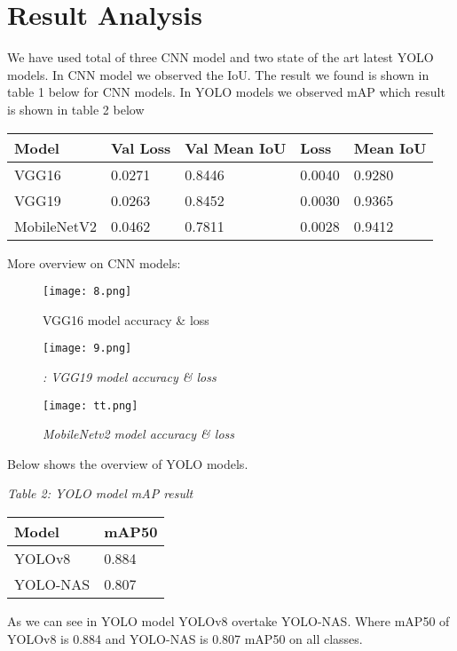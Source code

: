 \documentclass[conference]{IEEEtran}
\begin{document}
\section{Result Analysis}
We have used total of three CNN model and two state of the art latest YOLO models. In CNN model we observed the IoU. The result we found is shown in table 1 below for CNN models. In YOLO models we observed mAP which result is shown in table 2 below


\begin{table}
\centering

\begin{tabular}{| l | l | l | l | l |}
\hline
\textbf{Model } & \textbf{Val Loss } & \textbf{Val Mean IoU } & \textbf{Loss } & \textbf{Mean IoU } \\
\hline
VGG16  & 0.0271  & 0.8446  & 0.0040  & 0.9280  \\
\hline
VGG19  & 0.0263  & 0.8452  & 0.0030  & 0.9365  \\
\hline
MobileNetV2  & 0.0462  & 0.7811  & 0.0028  & 0.9412  \\
\hline

\end{tabular}

\end{table}

More overview on CNN models: 
\begin{figure}
    \centering
    \texttt{[image: 8.png]}
    \caption{ VGG16 model accuracy \& loss } 
    \label{fig:6}
\end{figure}
\begin{figure}
    \centering
    \texttt{[image: 9.png]}
    \caption{\textit{: VGG19 model accuracy \& loss } }
    \label{fig:7}
\end{figure}
\begin{figure}
    \centering
    \texttt{[image: tt.png]}
    \caption{\textit{MobileNetv2 model accuracy \& loss }
}
    \label{fig:8}
\end{figure}
Below shows the overview of YOLO models. 

\textit{Table 2: YOLO model mAP result }

\begin{table}
\centering

\begin{tabular}{| l | l |}
\hline
\textbf{Model } & \textbf{mAP50 } \\
\hline
YOLOv8  & 0.884  \\
\hline
YOLO-NAS  & 0.807  \\
\hline

\end{tabular}

\end{table}
As we can see in YOLO model YOLOv8 overtake YOLO-NAS. Where mAP50 of YOLOv8 is 0.884 and YOLO-NAS is 0.807 mAP50 on all classes. 
\end{document}
